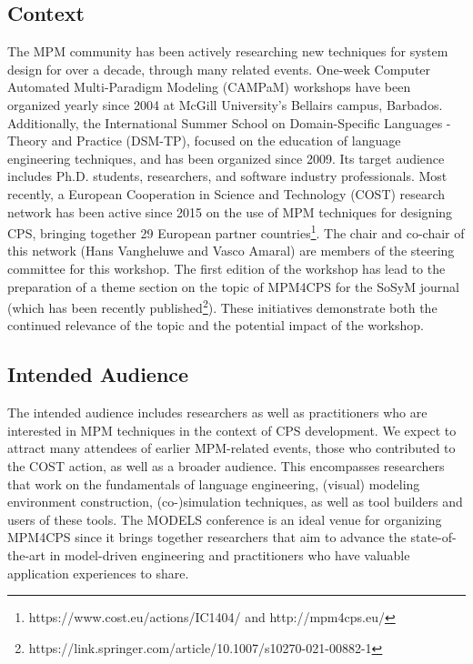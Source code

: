 \subsection{Context}
The MPM community has been actively researching new techniques for system design 
for over a decade, through many related events.
One-week Computer Automated Multi-Paradigm Modeling (CAMPaM) workshops have been 
organized yearly since 2004 at McGill University’s Bellairs campus, Barbados. 
Additionally, the International Summer School on Domain-Specific Languages - 
Theory and Practice (DSM-TP), focused on the education of language engineering 
techniques, and has been organized since 2009.
Its target audience includes Ph.D. students, researchers, and software industry 
professionals.
Most recently, a European Cooperation in Science and Technology (COST) research 
network has been active since 2015 on the use of MPM techniques for designing 
CPS, bringing together 29 European partner countries\footnote{https://www.cost.eu/actions/IC1404/ 
and http://mpm4cps.eu/}.
The chair and co-chair of this network (Hans Vangheluwe and Vasco Amaral) are 
members of the steering committee for this workshop.
The first edition of the workshop has lead to the preparation of a theme section on the topic of MPM4CPS for the SoSyM journal (which has been recently published\footnote{ https://link.springer.com/article/10.1007/s10270-021-00882-1}).
These initiatives demonstrate both the continued relevance of the topic and the 
potential impact of the workshop.


\subsection{Intended Audience}
The intended audience includes researchers as well as practitioners who are 
interested in MPM techniques in the context of CPS development.
We expect to attract many attendees of earlier MPM-related events, those who 
contributed to the COST action, as well as a broader audience.
This encompasses researchers that work on the fundamentals of language 
engineering, (visual) modeling environment construction, (co-)simulation 
techniques, as well as tool builders and users of these tools.
The MODELS conference is an ideal venue for organizing MPM4CPS since it brings 
together researchers that aim to advance the state-of-the-art in model-driven 
engineering and practitioners who have valuable application experiences to share.

